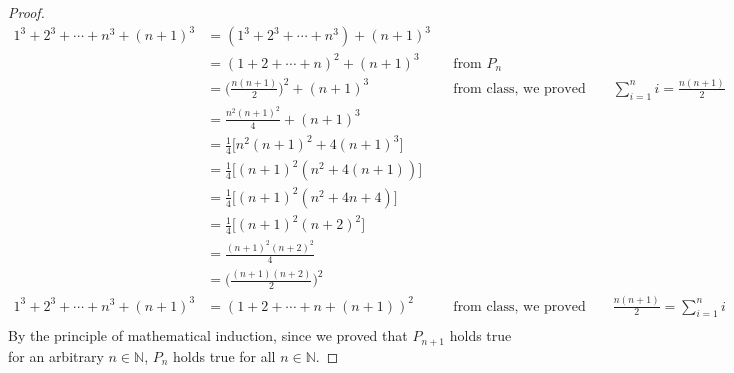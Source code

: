 \message{ !name(Problem_Set_2.tex)}\documentclass[13pt]{article}
\begin{document}
\begin{proof}
  \begin{align*}
    1^3 + 2^3 + \cdots + n^3 + (n + 1)^3 &= (1^3 + 2^3 + \cdots + n^3) + (n + 1)^3 \\
                                         &= (1 + 2 + \cdots + n)^2 + (n + 1)^3 && \text{from } P_n \\
                                         &= \bigg(\frac{n(n + 1)}{2}\bigg)^2 + (n + 1)^3
                                         && \text{from class, we proved that } \sum_{i = 1}^ni =
                                            \frac{n(n + 1)}{2} \\
                                         &= \frac{n^2(n + 1)^2}{4} + (n + 1)^3 \\
                                         &= \frac{1}{4}\bigg[n^2(n + 1)^2 + 4(n + 1)^3\bigg] \\
                                         &= \frac{1}{4}\bigg[(n + 1)^2(n^2 + 4(n + 1))\bigg] \\
                                         &= \frac{1}{4}\bigg[(n + 1)^2(n^2 + 4n + 4)\bigg] \\
                                         &= \frac{1}{4}\bigg[(n + 1)^2(n + 2)^2\bigg] \\
                                         &= \frac{(n + 1)^2(n + 2)^2}{4} \\
                                         &= \bigg(\frac{(n + 1)(n + 2)}{2}\bigg)^2 \\
    1^3 + 2^3 + \cdots + n^3 + (n + 1)^3 &= (1 + 2 + \cdots + n + (n + 1))^2 && \text{from class, we
                                                                                proved that }
                                                                                \frac{n(n + 1)}{2} =
                                                                                \sum_{i = 1}^ni \\
  \end{align*}
  By the principle of mathematical induction, since we proved that $P_{n + 1}$ holds true for an
  arbitrary $n \in \mathbb{N}$, $P_n$ holds true for all $n \in \mathbb{N}$.
\end{proof}





\newpage
\end{document}
